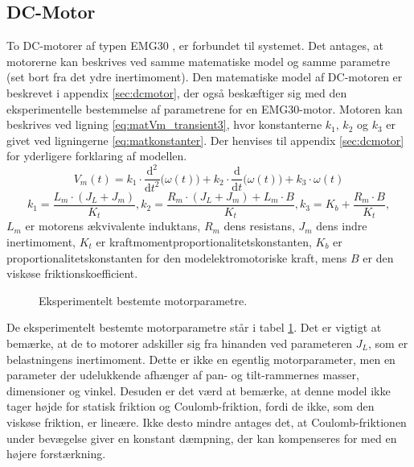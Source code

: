 \subsection{DC-Motor}
To DC-motorer af typen EMG30 \citep{emgmotor}, er forbundet til systemet.
Det antages, at motorerne kan beskrives ved samme matematiske model og samme parametre (set bort fra det ydre inertimoment).
Den matematiske model af DC-motoren er beskrevet i appendix \ref{sec:dcmotor},
der også beskæftiger sig med den eksperimentelle bestemmelse af parametrene for en EMG30-motor.
Motoren kan beskrives ved ligning \ref{eq:matVm_transient3}, hvor konstanterne \(k_1\), \(k_2\) og \(k_3\)
er givet ved ligningerne \ref{eq:matkonstanter}. Der henvises til appendix \ref{sec:dcmotor}
for yderligere forklaring af modellen.
\begin{equation}
	V_m\left(t\right)=k_1\cdot{}\frac{\mathrm d^2}{\mathrm d t^2} \big(\omega\left(t\right) \big)
		+k_2\cdot{}\frac{\mathrm d}{\mathrm d t} \big(\omega\left(t\right) \big)
		+k_3\cdot{}\omega\left(t\right)
	\label{eq:matVm_transient3}
 \end{equation}
\begin{equation}
	k_1=\frac{L_m\cdot{}\left(J_L+J_m\right)}{K_t},
	k_2=\frac{R_m\cdot{}\left(J_L+J_m\right)+L_m\cdot{}B}{K_t},
	k_3=K_b+\frac{R_m\cdot{}B}{K_t},
	\label{eq:matkonstanter} 
 \end{equation}
\(L_m\) er motorens ækvivalente induktans, \(R_m\) dens resistans, \(J_m\) dens indre inertimoment,
\(K_t\) er kraftmomentproportionalitetskonstanten, \(K_b\) er proportionalitetskonstanten for den modelektromotoriske kraft,
mens \(B\) er den viskøse friktionskoefficient.
\begin{figure}[th!]
	\centering
	
	\captionsetup{type=table}
	\caption[Motorparametre]
			{Eksperimentelt bestemte motorparametre.}
	\label{tb:matmotorparametre}
\end{figure}
De eksperimentelt bestemte motorparametre står i tabel \ref{tb:matmotorparametre}.
Det er vigtigt at bemærke, at de to motorer adskiller sig fra hinanden ved parameteren \(J_L\), som er belastningens
inertimoment. Dette er ikke en egentlig motorparameter, men en parameter der udelukkende afhænger
af pan- og tilt-rammernes masser, dimensioner og vinkel.
Desuden er det værd at bemærke, at denne model ikke tager højde for statisk friktion og Coulomb-friktion,
fordi de ikke, som den viskøse friktion, er lineære. Ikke desto mindre antages det, at Coulomb-friktionen under
bevægelse giver en konstant dæmpning, der kan kompenseres for med en højere forstærkning.

